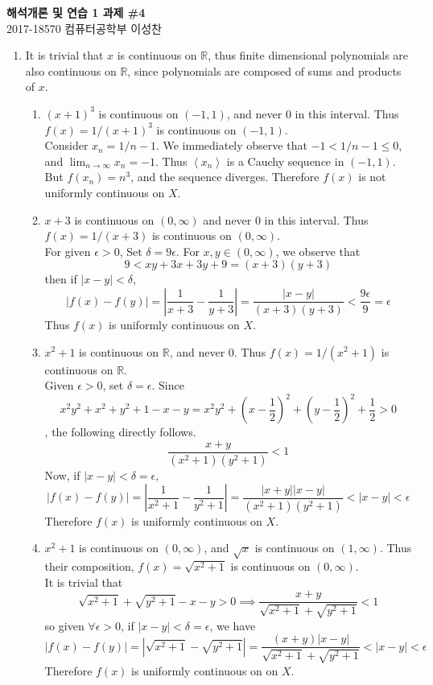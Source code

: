 \documentclass[11pt]{report}
\renewcommand{\span}[1]{\left\langle #1 \right\rangle}
\newcommand{\ra}{\rightarrow}
\newcommand{\abs}[1]{\left|#1\right|}
\newcommand{\imp}{\implies}
\newcommand{\R}{\mathbb{R}}
\begin{document}
\begin{center}
\textbf{\Large 해석개론 및 연습 1 과제 \#4}\\
\large 2017-18570 컴퓨터공학부 이성찬
\end{center}
\begin{enumerate}
\item It is trivial that $ x $ is continuous on $\R$, thus finite dimensional polynomials are also continuous on $\R$, since polynomials are composed of sums and products of $x$.
\begin{enumerate}
	\item $(x+1)^3$ is continuous on $(-1, 1)$, and never 0 in this interval. Thus $f(x) = 1/(x+1)^3$ is continuous on $(-1, 1)$.\\
	Consider $x_n = 1/n - 1$. We immediately observe that $-1 < 1/n - 1 \leq 0$, and $\lim_{n\ra\infty}x_n = -1$. Thus $\span{x_n}$ is a Cauchy sequence in $(-1, 1)$. But $f(x_n) = n^3$, and the sequence diverges. Therefore $f(x)$ is not uniformly continuous on $X$.
	\item $x+3$ is continuous on $(0, \infty)$ and never 0 in this interval. Thus $f(x) = 1/(x+3)$ is continuous on $ (0, \infty) $.\\
	For given $\epsilon > 0$, Set $\delta = 9\epsilon$. For $x, y\in (0, \infty)$, we observe that $$9 < xy + 3x + 3y + 9 = (x+3)(y+3)$$ then if $\abs{x - y} < \delta$, $$\abs{f(x) -f(y)} = \abs{\frac{1}{x+3} - \frac{1}{y+3}} = \frac{\abs{x - y}}{(x+3)(y+3)} < \frac{9\epsilon}{9} = \epsilon$$Thus $f(x)$ is uniformly continuous on $X$.
	\item $x^2+1$ is continuous on $\R$, and never 0. Thus $f(x) = 1/(x^2+1)$ is continuous on $\R$.\\
	Given $\epsilon >0$, set $\delta = \epsilon$. Since $$x^2y^2 +x^2+y^2+1 - x - y = x^2y^2 + \left(x - \frac{1}{2}\right)^2 + \left(y - \frac{1}{2}\right)^2+ \frac{1}{2} > 0$$
	, the following directly follows. $$\frac{x+y}{(x^2+1)(y^2+1)} < 1$$
	Now, if $\abs{x - y} < \delta = \epsilon$, $$\abs{f(x) - f(y)} = \abs{\frac{1}{x^2+1} - \frac{1}{y^2+1}} = \frac{\abs{x + y}\abs{x - y}}{(x^2+ 1)(y^2+1)} < \abs{x - y}  < \epsilon$$
	Therefore $f(x)$ is uniformly continuous on $X$.
	\item $x^2+1$ is continuous on $(0, \infty)$, and $\sqrt{x}$ is continuous on $(1, \infty)$. Thus their composition, $f(x) = \sqrt{x^2+1}$ is continuous on $(0, \infty)$.\\
	It is trivial that $$\sqrt{x^2+1} + \sqrt{y^2+1} - x - y > 0 \imp \frac{x+y}{\sqrt{x^2+1}+\sqrt{y^2+1}} < 1$$ so given $\forall \epsilon > 0$, if $\abs{x - y} < \delta = \epsilon$, we have $$\abs{f(x) - f(y)} = \abs{\sqrt{x^2+1} - \sqrt{y^2+1}} = \frac{(x+y)\abs{x - y}}{\sqrt{x^2+1}+\sqrt{y^2+1}} <\abs{x - y} < \epsilon$$
	Therefore $f(x)$ is uniformly continuous on on $X$.
\end{enumerate}


\end{enumerate}
\end{document}
